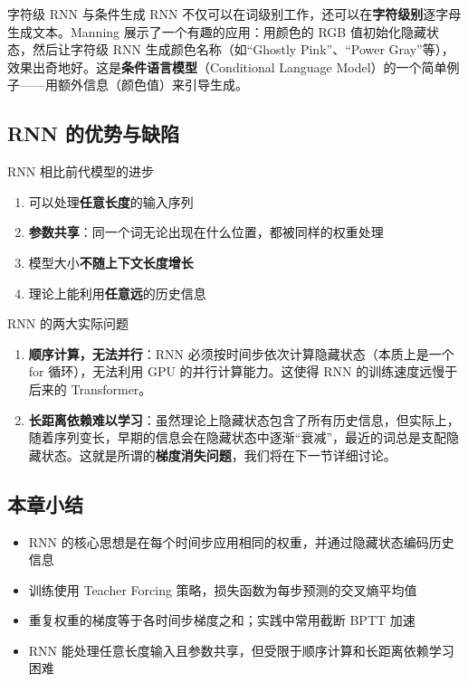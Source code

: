 \documentclass[a4paper]{article}
\begin{document}
\begin{knowledgebox}{字符级 RNN 与条件生成}
RNN 不仅可以在词级别工作，还可以在\textbf{字符级别}逐字母生成文本。Manning 展示了一个有趣的应用：用颜色的 RGB 值初始化隐藏状态，然后让字符级 RNN 生成颜色名称（如``Ghostly Pink''、``Power Gray''等），效果出奇地好。这是\textbf{条件语言模型}（Conditional Language Model）的一个简单例子——用额外信息（颜色值）来引导生成。
\end{knowledgebox}

\subsection{RNN 的优势与缺陷}

\begin{importantbox}{RNN 相比前代模型的进步}
\begin{enumerate}
    \item 可以处理\textbf{任意长度}的输入序列
    \item \textbf{参数共享}：同一个词无论出现在什么位置，都被同样的权重处理
    \item 模型大小\textbf{不随上下文长度增长}
    \item 理论上能利用\textbf{任意远}的历史信息
\end{enumerate}
\end{importantbox}

\begin{warningbox}{RNN 的两大实际问题}
\begin{enumerate}
    \item \textbf{顺序计算，无法并行}：RNN 必须按时间步依次计算隐藏状态（本质上是一个 for 循环），无法利用 GPU 的并行计算能力。这使得 RNN 的训练速度远慢于后来的 Transformer。
    \item \textbf{长距离依赖难以学习}：虽然理论上隐藏状态包含了所有历史信息，但实际上，随着序列变长，早期的信息会在隐藏状态中逐渐``衰减''，最近的词总是支配隐藏状态。这就是所谓的\textbf{梯度消失问题}，我们将在下一节详细讨论。
\end{enumerate}
\end{warningbox}

\subsection{本章小结}

\begin{itemize}
    \item RNN 的核心思想是在每个时间步应用相同的权重，并通过隐藏状态编码历史信息
    \item 训练使用 Teacher Forcing 策略，损失函数为每步预测的交叉熵平均值
    \item 重复权重的梯度等于各时间步梯度之和；实践中常用截断 BPTT 加速
    \item RNN 能处理任意长度输入且参数共享，但受限于顺序计算和长距离依赖学习困难
\end{itemize}
\end{document}
